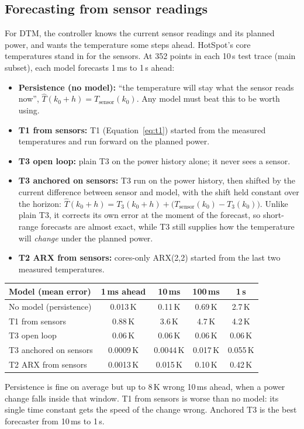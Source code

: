 \documentclass[11pt,a4paper]{article}
\begin{document}
\subsection{Forecasting from sensor readings}
For DTM, the controller knows the current sensor readings and its planned power, and wants the
temperature some steps ahead. HotSpot's core temperatures stand in for the sensors. At 352 points
in each 10\,s test trace (main subset), each model forecasts 1\,ms to 1\,s ahead:
\begin{itemize}
  \item \textbf{Persistence (no model):} ``the temperature will stay what the sensor reads now'',
        $\hat T(k_0 + h) = T_\text{sensor}(k_0)$. Any model must beat this to be worth using.
  \item \textbf{T1 from sensors:} T1 (Equation~\eqref{eq:t1}) started from the measured
        temperatures and run forward on the planned power.
  \item \textbf{T3 open loop:} plain T3 on the power history alone; it never sees a sensor.
  \item \textbf{T3 anchored on sensors:} T3 run on the power history, then shifted by the current
        difference between sensor and model, with the shift held constant over the horizon:
        $\hat T(k_0 + h) = T_3(k_0 + h) + \big(T_\text{sensor}(k_0) - T_3(k_0)\big)$.
        Unlike plain T3, it corrects its own error at the moment of the forecast, so short-range
        forecasts are almost exact, while T3 still supplies how the temperature will \emph{change}
        under the planned power.
  \item \textbf{T2 ARX from sensors:} cores-only ARX(2,2) started from the last two measured
        temperatures.
\end{itemize}

\begin{center}
\small
\begin{tabular}{@{}l c c c c@{}}
\toprule
Model (mean error) & 1\,ms ahead & 10\,ms & 100\,ms & 1\,s \\
\midrule
No model (persistence) & 0.013\,K & 0.11\,K & 0.69\,K & 2.7\,K \\
T1 from sensors & 0.88\,K & 3.6\,K & 4.7\,K & 4.2\,K \\
T3 open loop & 0.06\,K & 0.06\,K & 0.06\,K & 0.06\,K \\
T3 anchored on sensors & 0.0009\,K & 0.0044\,K & 0.017\,K & 0.055\,K \\
T2 ARX from sensors & 0.0013\,K & 0.015\,K & 0.10\,K & 0.42\,K \\
\bottomrule
\end{tabular}
\end{center}
Persistence is fine on average but up to 8\,K wrong 10\,ms ahead, when a power change falls inside
that window. T1 from sensors is worse than no model: its single time constant gets the speed of the
change wrong. Anchored T3 is the best forecaster from 10\,ms to 1\,s.
\end{document}
